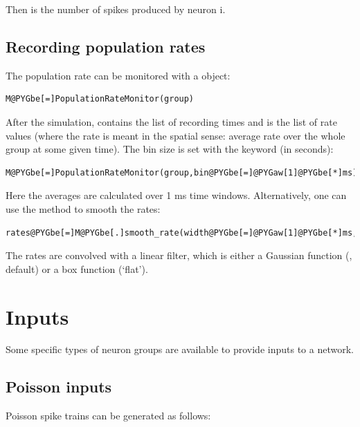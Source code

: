 \documentclass[letterpaper,10pt]{manual}
\begin{document}
Then  is the number of spikes produced by neuron i.


\subsection{Recording population rates}

The population rate can be monitored with a \hyperlink{brian.PopulationRateMonitor}{} object:

\begin{Verbatim}[commandchars=@\[\]]
M@PYGbe[=]PopulationRateMonitor(group)
\end{Verbatim}

After the simulation,  contains the list of recording times and
 is the list of rate values (where the rate is meant in the spatial sense: average rate over
the whole group at some given time). The bin size is set with the  keyword (in seconds):

\begin{Verbatim}[commandchars=@\[\]]
M@PYGbe[=]PopulationRateMonitor(group,bin@PYGbe[=]@PYGaw[1]@PYGbe[*]ms)
\end{Verbatim}

Here the averages are calculated over 1 ms time windows. Alternatively, one can use the
 method to smooth the rates:

\begin{Verbatim}[commandchars=@\[\]]
rates@PYGbe[=]M@PYGbe[.]smooth_rate(width@PYGbe[=]@PYGaw[1]@PYGbe[*]ms,@PYGaX[filter]@PYGbe[=]@PYGad[']@PYGad[gaussian]@PYGad['])
\end{Verbatim}

The rates are convolved with a linear filter, which is either a Gaussian function
(, default) or a box function (`flat').

\resetcurrentobjects


\section{Inputs}

Some specific types of neuron groups are available to provide inputs to a network.


\subsection{Poisson inputs}

Poisson spike trains can be generated as follows:
\end{document}
